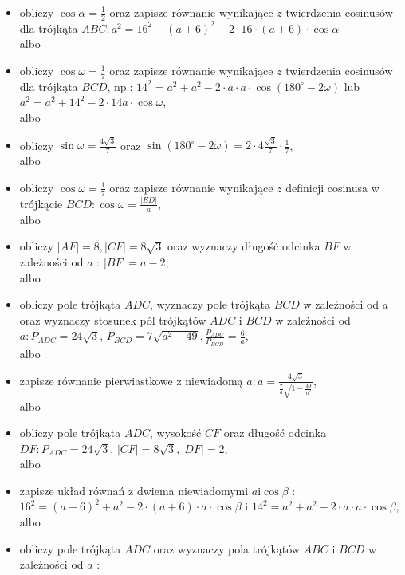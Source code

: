 \documentclass[10pt]{article}
\begin{document}
\begin{itemize}
  \item obliczy $\cos \alpha=\frac{1}{2}$ oraz zapisze równanie wynikające $z$ twierdzenia cosinusów dla trójkąta $A B C: a^{2}=16^{2}+(a+6)^{2}-2 \cdot 16 \cdot(a+6) \cdot \cos \alpha$\\
albo
  \item obliczy $\cos \omega=\frac{1}{7}$ oraz zapisze równanie wynikające $z$ twierdzenia cosinusów dla trójkąta $B C D$, np.: $14^{2}=a^{2}+a^{2}-2 \cdot a \cdot a \cdot \cos \left(180^{\circ}-2 \omega\right)$ lub $a^{2}=a^{2}+14^{2}-2 \cdot 14 a \cdot \cos \omega$,\\
albo
  \item obliczy $\sin \omega=\frac{4 \sqrt{3}}{7}$ oraz $\sin \left(180^{\circ}-2 \omega\right)=2 \cdot 4 \frac{\sqrt{3}}{7} \cdot \frac{1}{7}$,\\
albo
  \item obliczy $\cos \omega=\frac{1}{7}$ oraz zapisze równanie wynikające $z$ definicji cosinusa w trójkącie $B C D: \cos \omega=\frac{|E D|}{a}$,\\
albo
  \item obliczy $|A F|=8,|C F|=8 \sqrt{3}$ oraz wyznaczy długość odcinka $B F$ w zależności od $a$ : $|B F|=a-2$,\\
albo
  \item obliczy pole trójkąta $A D C$, wyznaczy pole trójkąta $B C D$ w zależności od $a$ oraz wyznaczy stosunek pól trójkątów $A D C$ i $B C D$ w zależności od $a: P_{A D C}=24 \sqrt{3}$, $P_{B C D}=7 \sqrt{a^{2}-49}, \frac{P_{A D C}}{P_{B C D}}=\frac{6}{a}$,\\
albo
  \item zapisze równanie pierwiastkowe z niewiadomą $a: a=\frac{4 \sqrt{3}}{\frac{7}{a} \sqrt{1-\frac{49}{a^{2}}}}$,\\
albo
  \item obliczy pole trójkąta $A D C$, wysokość $C F$ oraz długość odcinka $D F: P_{A D C}=24 \sqrt{3}$, $|C F|=8 \sqrt{3},|D F|=2$,\\
albo
  \item zapisze układ równań z dwiema niewiadomymi $a \mathrm{i} \cos \beta$ : $16^{2}=(a+6)^{2}+a^{2}-2 \cdot(a+6) \cdot a \cdot \cos \beta$ i $14^{2}=a^{2}+a^{2}-2 \cdot a \cdot a \cdot \cos \beta$,\\
albo
  \item obliczy pole trójkąta $A D C$ oraz wyznaczy pola trójkątów $A B C$ i $B C D$ w zależności od $a$ :
\end{itemize}
\end{document}
